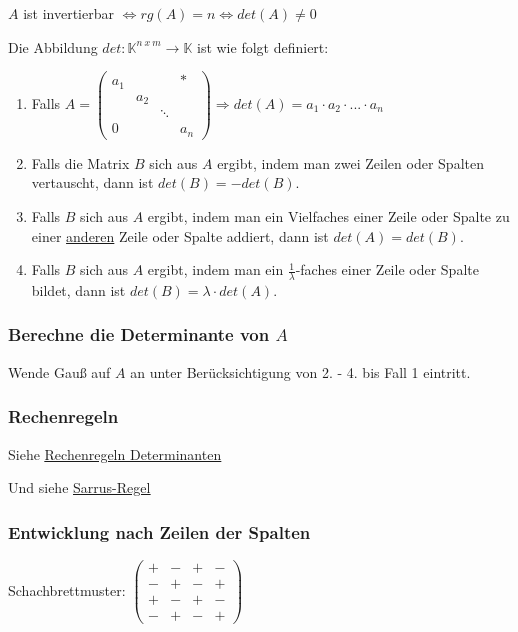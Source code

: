 \documentclass{scrartcl}
\newcommand{\linkTo}[1]{\hyperref[#1]{\underline{#1}}}
\begin{document}
\begin{Notiz}
  $A$ ist invertierbar $\Leftrightarrow rg(A) = n \Leftrightarrow det(A) \neq 0$
\end{Notiz}

Die Abbildung $det : \mathbb{K}^{n~x~m} \rightarrow \mathbb{K} $ ist wie folgt definiert: 
\begin{enumerate}
\item Falls $ A = 
\begin{pmatrix} 
a_1 &  &  & * \\
 & a_2 &  &  \\
 &  & \ddots &  \\
0 &  &  & a_n
\end{pmatrix} \Rightarrow det(A) = a_1 \cdot a_2 \cdot ... \cdot a_n$ 
\item Falls die Matrix $B$ sich aus $A$ ergibt, indem man zwei Zeilen oder Spalten vertauscht, dann ist $det(B) = - det(B)$.
\item Falls $B$ sich aus $A$ ergibt, indem man ein Vielfaches einer Zeile oder Spalte zu einer \underline{anderen} Zeile oder Spalte addiert, dann ist $det(A) = det(B)$.
\item Falls $B$ sich aus $A$ ergibt, indem man ein $\frac{1}{\lambda}$-faches einer Zeile oder Spalte bildet, dann ist $det(B) = \lambda \cdot det(A)$.
\end{enumerate}

\subsubsection{Berechne die Determinante von $A$}

Wende Gauß auf $A$ an unter Berücksichtigung von 2. - 4. bis Fall 1 eintritt.

\subsubsection{Rechenregeln}

Siehe \linkTo{Rechenregeln Determinanten}


Und siehe \linkTo{Sarrus-Regel}

\subsubsection{Entwicklung nach Zeilen der Spalten}

\begin{Notiz}
Schachbrettmuster: $
\begin{pmatrix}
+ & - & + & - \\
- & + & - & + \\
+ & - & + & - \\
- & + & - & +
\end{pmatrix}
$
\end{Notiz}
\end{document}

